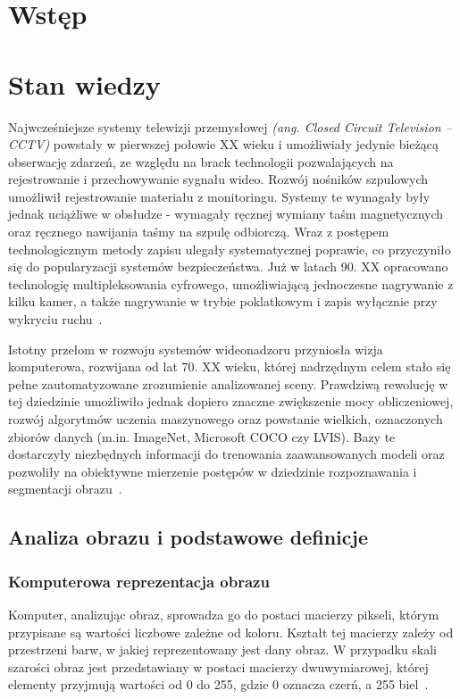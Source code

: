 \chapter{Wstęp}\label{chap:wprowadzenie}

\chapter{Stan wiedzy}\label{chap:stan_wiedzy}
Najwcześniejsze systemy telewizji przemysłowej \textit{(ang. Closed Circuit Television -- CCTV)}
powstały w pierwszej połowie XX wieku i umożliwiały jedynie bieżącą obserwację zdarzeń, ze względu
na brack technologii pozwalających na rejestrowanie i przechowywanie sygnału wideo. Rozwój nośników
szpulowych umożliwił rejestrowanie materiału z monitoringu. Systemy te wymagały były jednak
uciążliwe w obsłudze - wymagały ręcznej wymiany taśm magnetycznych oraz ręcznego nawijania taśmy na
szpulę odbiorczą. Wraz z postępem technologicznym metody zapisu ulegały systematycznej poprawie, co
przyczyniło się do popularyzacji systemów bezpieczeństwa. Już w latach 90. XX opracowano
technologię multipleksowania cyfrowego, umożliwiającą jednoczesne nagrywanie z kilku kamer, a także
nagrywanie w trybie poklatkowym i zapis wyłącznie przy wykryciu ruchu~\cite{kreugle}.

Istotny przełom w rozwoju systemów wideonadzoru przyniosła wizja komputerowa, rozwijana od lat 70.
XX wieku, której nadrzędnym celem stało się pełne zautomatyzowane zrozumienie analizowanej sceny.
Prawdziwą rewolucję w tej dziedzinie umożliwiło jednak dopiero znaczne zwiększenie mocy
obliczeniowej, rozwój algorytmów uczenia maszynowego oraz powstanie wielkich, oznaczonych zbiorów
danych (m.in. ImageNet, Microsoft COCO czy LVIS). Bazy te dostarczyły niezbędnych informacji do
trenowania zaawansowanych modeli oraz pozwoliły na obiektywne mierzenie postępów w dziedzinie
rozpoznawania i segmentacji obrazu~\cite{szeliski2022}.


\section{Analiza obrazu i podstawowe definicje}

\subsection{Komputerowa reprezentacja obrazu}
Komputer, analizując obraz, sprowadza go do postaci macierzy pikseli, którym przypisane są wartości
liczbowe zależne od koloru. Kształt tej macierzy zależy od przestrzeni barw, w jakiej
reprezentowany jest dany obraz. W przypadku skali szarości obraz jest przedstawiany w postaci
macierzy dwuwymiarowej, której elementy przyjmują wartości od 0 do 255, gdzie 0 oznacza czerń, a
255 biel~\cite{gonzalezwoods}.

